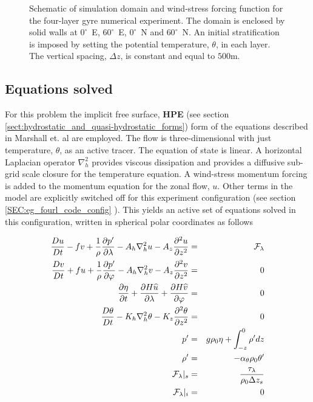 \begin{figure}
\centerline{
}
\caption{Schematic of simulation domain and wind-stress forcing function 
for the four-layer gyre numerical experiment. The domain is enclosed by solid
walls at $0^{\circ}$~E, $60^{\circ}$~E, $0^{\circ}$~N and $60^{\circ}$~N.
An initial stratification is 
imposed by setting the potential temperature, $\theta$, in each layer.
The vertical spacing, $\Delta z$, is constant and equal to $500$m.
}
\label{FIG:eg-fourlayer-simulation_config}
\end{figure}

\subsection{Equations solved}
\label{www:tutorials}
For this problem
the implicit free surface, {\bf HPE} (see section \ref{sect:hydrostatic_and_quasi-hydrostatic_forms}) form of the 
equations described in Marshall et. al \cite{marshall:97a} are
employed. The flow is three-dimensional with just temperature, $\theta$, as 
an active tracer.  The equation of state is linear.
A horizontal Laplacian operator $\nabla_{h}^2$ provides viscous
dissipation and provides a diffusive sub-grid scale closure for the 
temperature equation. A wind-stress momentum forcing is added to the momentum 
equation for the zonal flow, $u$. Other terms in the model
are explicitly switched off for this experiment configuration (see section
\ref{SEC:eg_fourl_code_config} ). This yields an active set of equations
solved in this configuration, written in spherical polar coordinates as 
follows

\begin{eqnarray}
\label{EQ:eg-fourlayer-model_equations}
\frac{Du}{Dt} - fv + 
  \frac{1}{\rho}\frac{\partial p^{\prime}}{\partial \lambda} - 
  A_{h}\nabla_{h}^2u - A_{z}\frac{\partial^{2}u}{\partial z^{2}} 
& = &
\cal{F}_{\lambda}
\\
\frac{Dv}{Dt} + fu + 
  \frac{1}{\rho}\frac{\partial p^{\prime}}{\partial \varphi} - 
  A_{h}\nabla_{h}^2v - A_{z}\frac{\partial^{2}v}{\partial z^{2}} 
& = &
0
\\
\frac{\partial \eta}{\partial t} + \frac{\partial H \widehat{u}}{\partial \lambda} +
\frac{\partial H \widehat{v}}{\partial \varphi}
&=&
0
\label{eq:fourl_example_continuity}
\\
\frac{D\theta}{Dt} -
 K_{h}\nabla_{h}^2\theta  - K_{z}\frac{\partial^{2}\theta}{\partial z^{2}} 
& = &
0
\label{eq:eg_fourl_theta}
\\
p^{\prime} & = &
g\rho_{0} \eta + \int^{0}_{-z}\rho^{\prime} dz
\\
\rho^{\prime} & = &- \alpha_{\theta}\rho_{0}\theta^{\prime}
\\
{\cal F}_{\lambda} |_{s} & = & \frac{\tau_{\lambda}}{\rho_{0}\Delta z_{s}}
\\
{\cal F}_{\lambda} |_{i} & = & 0
\end{eqnarray}

